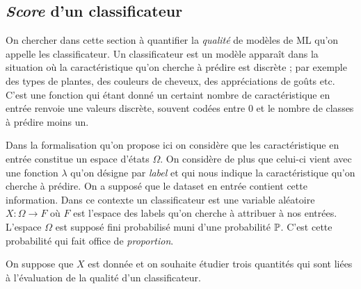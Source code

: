 \documentclass[11pt, a4paper]{article}
\begin{document}
\subsection{\emph{Score} d'un classificateur}
\label{sec:classificateurAlea}

On chercher dans cette section à quantifier la \textit{qualité} de
modèles de ML qu'on appelle les classificateur. Un classificateur est
un modèle apparaît dans la situation où la caractéristique qu'on
cherche à prédire est discrète ; par exemple des types de plantes, des
couleurs de cheveux, des appréciations de goûts etc. C'est une
fonction qui étant donné un certaint nombre de caractéristique en
entrée renvoie une valeurs discrète, souvent codées entre $0$ et le
nombre de classes à prédire moins un.

Dans la formalisation qu'on propose ici on considère que les
caractéristique en entrée constitue un espace d'états $\Omega$. On
considère de plus que celui-ci vient avec une fonction $\lambda$ qu'on
désigne par \textit{label} et qui nous indique la caractéristique
qu'on cherche à prédire. On a supposé que le dataset en entrée
contient cette information. Dans ce contexte un classificateur est une
variable aléatoire $X : \Omega \to F$ où $F$ est l'espace des labels
qu'on cherche à attribuer à nos entrées. L'espace $\Omega$ est supposé
fini probabilisé muni d'une probabilité $\mathbb{P}$. C'est cette
probabilité qui fait office de \textit{proportion}.

On suppose que $X$ est donnée et on souhaite étudier trois quantités
qui sont liées à l'évaluation de la qualité d'un classificateur.
\end{document}
